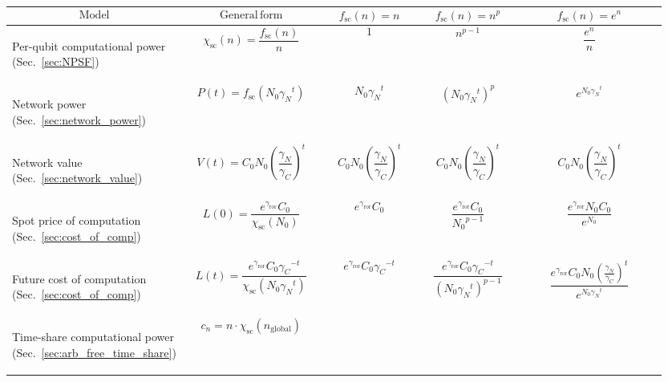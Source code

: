 \begin{table}[!htbp]
{\footnotesize
\begin{tabular}{|m{0.21\linewidth}|m{0.21\linewidth}|m{0.15\linewidth}|m{0.155\linewidth}|m{0.225\linewidth}|}
	\hline
	\[\mathrm{Model}\] & \[\mathrm{General\, form}\] & \[f_\mathrm{sc}(n)=n\] & \[f_\mathrm{sc}(n)=n^p\] & \[f_\mathrm{sc}(n)=e^n\]\\
	\hline \hline
	\begin{flushleft}Per-qubit computational power (Sec.~\ref{sec:NPSF})\end{flushleft} & \[\chi_\mathrm{sc}(n)=\frac{f_\mathrm{sc}(n)}{n}\] & \[1\] & \[n^{p-1}\] & \[\frac{e^n}{n}\]\\
	\hline
	\begin{flushleft}Network power (Sec.~\ref{sec:network_power})\end{flushleft} & \[P(t)=f_\mathrm{sc}(N_0{\gamma_N}^t)\] & \[N_0{\gamma_N}^t\] & \[\left(N_0{\gamma_N}^t\right)^p\] & \[ e^{N_0{\gamma_N}^t}\] \\
	\hline
	\begin{flushleft}Network value (Sec.~\ref{sec:network_value})\end{flushleft} & \[V(t)=C_0 N_0 \left(\frac{\gamma_N}{\gamma_C}\right)^t\] & \[C_0 N_0 \left(\frac{\gamma_N}{\gamma_C}\right)^t\] & \[C_0 N_0 \left(\frac{\gamma_N}{\gamma_C}\right)^t\] & \[C_0 N_0 \left(\frac{\gamma_N}{\gamma_C}\right)^t\] \\
	\hline
	\begin{flushleft}Spot price of computation (Sec.~\ref{sec:cost_of_comp})\end{flushleft} & \[L(0)=\frac{e^{\gamma_\mathrm{ror}} C_0}{\chi_\mathrm{sc}(N_0)}\] & \[e^{\gamma_\mathrm{ror}} C_0\] &  \[\frac{e^{\gamma_\mathrm{ror}}C_0}{{N_0}^{p-1}}\] & \[\frac{e^{\gamma_\mathrm{ror}}N_0C_0}{e^{N_0}}\] \\
	\hline
	\begin{flushleft}Future cost of computation (Sec.~\ref{sec:cost_of_comp})\end{flushleft} & \[L(t)=\frac{e^{\gamma_\mathrm{ror}} C_0{\gamma_C}^{-t}}{\chi_\mathrm{sc}(N_0 {\gamma_N}^t)}
\] & \[e^{\gamma_\mathrm{ror}} C_0{\gamma_C}^{-t} \] & \[ \frac{e^{\gamma_\mathrm{ror}} C_0{\gamma_C}^{-t}}{(N_0 {\gamma_N}^t)^{p-1}}
\] & \[ \frac{e^{\gamma_\mathrm{ror}} C_0N_0 \left(\frac{\gamma_N}{\gamma_C}\right)^t}{e^{N_0 {\gamma_N}^t}}\] \\
	\hline
	\begin{flushleft}Time-share computational power (Sec.~\ref{sec:arb_free_time_share})\end{flushleft} & \[c_n=n \cdot \chi_\mathrm{sc}(n_\mathrm{global})
\]
\end{tabular}}
\end{table}
